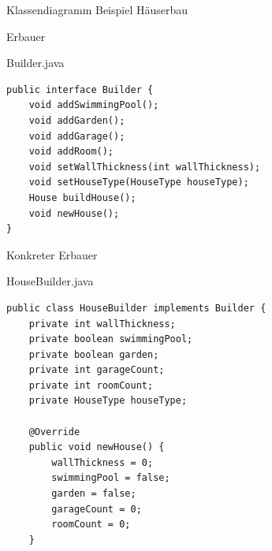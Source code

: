\begin{frame}{Klassendiagramm Beispiel Häuserbau}
\end{frame}

\begin{frame}[fragile]{Erbauer}
	\begin{exampleblock}{Builder.java}
 		\begin{lstlisting}
public interface Builder {
	void addSwimmingPool();
	void addGarden();
	void addGarage();
	void addRoom();
	void setWallThickness(int wallThickness);
	void setHouseType(HouseType houseType);
	House buildHouse();
	void newHouse();
}
 		\end{lstlisting}
 	\end{exampleblock}
\end{frame}

\begin{frame}[fragile]{Konkreter Erbauer}
	\begin{exampleblock}{HouseBuilder.java}
        \begin{lstlisting}
public class HouseBuilder implements Builder {
	private int wallThickness;
	private boolean swimmingPool;
	private boolean garden;
	private int garageCount;
	private int roomCount;
	private HouseType houseType;
	
	@Override
	public void newHouse() {
		wallThickness = 0;
		swimmingPool = false;
		garden = false;
		garageCount = 0;
		roomCount = 0;
	}
        \end{lstlisting}
 	\end{exampleblock}
\end{frame}

